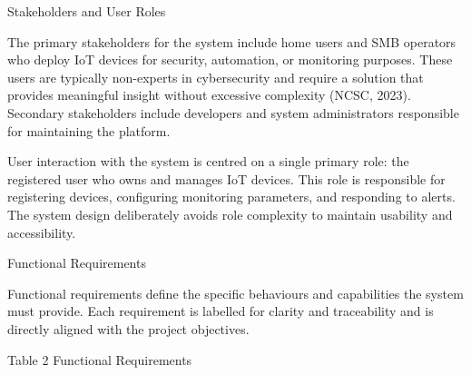 Stakeholders and User Roles

The primary stakeholders for the system include home users and SMB operators who deploy IoT devices for security, automation, or monitoring purposes. These users are typically non-experts in cybersecurity and require a solution that provides meaningful insight without excessive complexity (NCSC, 2023). Secondary stakeholders include developers and system administrators responsible for maintaining the platform.

User interaction with the system is centred on a single primary role: the registered user who owns and manages IoT devices. This role is responsible for registering devices, configuring monitoring parameters, and responding to alerts. The system design deliberately avoids role complexity to maintain usability and accessibility.

Functional Requirements

Functional requirements define the specific behaviours and capabilities the system must provide. Each requirement is labelled for clarity and traceability and is directly aligned with the project objectives.

Table 2 Functional Requirements

